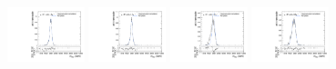 \begin{figure}[htpb]
  \centering
  \includegraphics[width=0.2\textwidth]{fig/2Dfit/templateVsReco_VBFGbuToWW2000_r0_MVV_mu_HP_nobb_LDy_linear.pdf}
  \includegraphics[width=0.2\textwidth]{fig/2Dfit/templateVsReco_VBFGbuToWW2000_r0_MVV_mu_LP_nobb_LDy_linear.pdf}
  \includegraphics[width=0.2\textwidth]{fig/2Dfit/templateVsReco_VBFGbuToWW2000_r0_MVV_mu_HP_nobb_HDy_linear.pdf}
  \includegraphics[width=0.2\textwidth]{fig/2Dfit/templateVsReco_VBFGbuToWW2000_r0_MVV_mu_LP_nobb_HDy_linear.pdf}\\

\end{figure}
